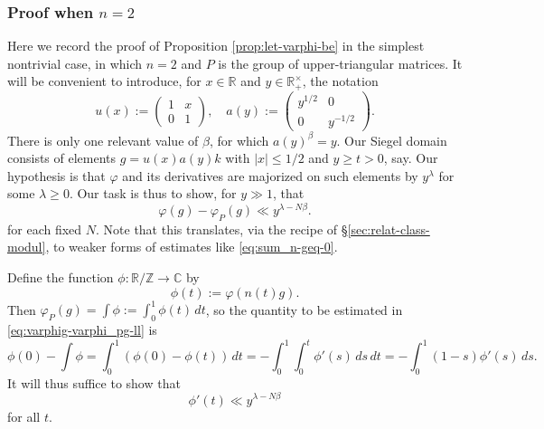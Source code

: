 \documentclass[reqno]{amsart} 
\begin{document}
\subsubsection{Proof when $n=2$}\label{sec:proof-when-n=2}
Here we record the proof of Proposition \ref{prop:let-varphi-be} in the simplest nontrivial case, in which $n = 2$ and $P$ is the group of upper-triangular matrices.  It will be convenient to introduce, for $x \in \mathbb{R}$ and $y \in \mathbb{R}^\times_+$, the notation
\begin{equation*}
  u(x) := 
  \begin{pmatrix}
    1 & x \\
    0 & 1
  \end{pmatrix}
  ,
  \quad
  a(y) := 
  \begin{pmatrix}
    y^{1/2} & 0 \\
    0 & y^{-1/2}
  \end{pmatrix}
  .
\end{equation*}
There is only one relevant value of $\beta$, for which $a(y)^{\beta} = y$.  Our Siegel domain consists of elements $g = u(x) a(y) k$ with $|x| \leq 1/2$ and $y \geq t > 0$, say.  Our hypothesis is that $\varphi$ and its derivatives are majorized on such elements by $y^{\lambda}$ for some $\lambda \geq 0$.  Our task is thus to show, for $y \gg 1$, that
\begin{equation}\label{eq:varphig-varphi_pg-ll}
  \varphi(g) - \varphi_P(g) \ll  y^{\lambda - N \beta}.
\end{equation}
for each fixed $N$.  Note that this translates, via the recipe of \S\ref{sec:relat-class-modul}, to weaker forms of estimates like \eqref{eq:sum_n-geq-0}.

Define the function $\phi : \mathbb{R}/\mathbb{Z} \rightarrow \mathbb{C}$ by
\begin{equation*}
  \phi (t)  := \varphi(n(t) g).
\end{equation*}
Then $\varphi_P(g) = \int \phi := \int_0^1 \phi(t) \, d t$, so the quantity to be estimated in \eqref{eq:varphig-varphi_pg-ll}
is
\begin{equation}\label{eq:phi0-int-phi}
  \phi(0) - \int \phi =
  \int _{0}^1 (\phi(0) - \phi(t) ) \, d t
  = - \int_{0}^1 \int_0^t \phi ' (s) \, d s \, d t
  = - \int_0^1 (1-s) \phi '(s) \, d s.
\end{equation}
It will thus suffice to show that
\begin{equation*}
  \phi '(t) \ll y^{\lambda - N \beta}
\end{equation*}
for all $t$.
\end{document}
